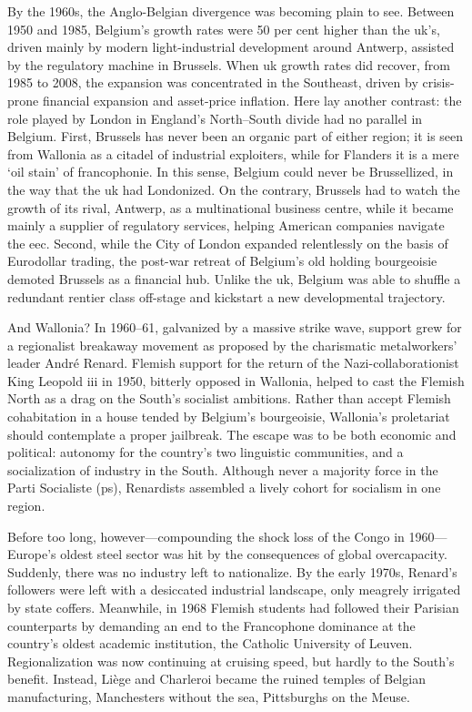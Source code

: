 \documentclass[
]{book}
\begin{document}
By the 1960s, the Anglo-Belgian divergence was becoming plain to see. Between 1950 and 1985, Belgium's growth rates were 50 per cent higher than the uk's, driven mainly by modern light-industrial development around Antwerp, assisted by the regulatory machine in Brussels. When uk growth rates did recover, from 1985 to 2008, the expansion was concentrated in the Southeast, driven by crisis-prone financial expansion and asset-price inflation. Here lay another contrast: the role played by London in England's North--South divide had no parallel in Belgium. First, Brussels has never been an organic part of either region; it is seen from Wallonia as a citadel of industrial exploiters, while for Flanders it is a mere `oil stain' of francophonie. In this sense, Belgium could never be Brussellized, in the way that the uk had Londonized. On the contrary, Brussels had to watch the growth of its rival, Antwerp, as a multinational business centre, while it became mainly a supplier of regulatory services, helping American companies navigate the eec. Second, while the City of London expanded relentlessly on the basis of Eurodollar trading, the post-war retreat of Belgium's old holding bourgeoisie demoted Brussels as a financial hub. Unlike the uk, Belgium was able to shuffle a redundant rentier class off-stage and kickstart a new developmental trajectory.

And Wallonia? In 1960--61, galvanized by a massive strike wave, support grew for a regionalist breakaway movement as proposed by the charismatic metalworkers' leader André Renard. Flemish support for the return of the Nazi-collaborationist King Leopold iii in 1950, bitterly opposed in Wallonia, helped to cast the Flemish North as a drag on the South's socialist ambitions. Rather than accept Flemish cohabitation in a house tended by Belgium's bourgeoisie, Wallonia's proletariat should contemplate a proper jailbreak. The escape was to be both economic and political: autonomy for the country's two linguistic communities, and a socialization of industry in the South. Although never a majority force in the Parti Socialiste (ps), Renardists assembled a lively cohort for socialism in one region.

Before too long, however---compounding the shock loss of the Congo in 1960---Europe's oldest steel sector was hit by the consequences of global overcapacity. Suddenly, there was no industry left to nationalize. By the early 1970s, Renard's followers were left with a desiccated industrial landscape, only meagrely irrigated by state coffers. Meanwhile, in 1968 Flemish students had followed their Parisian counterparts by demanding an end to the Francophone dominance at the country's oldest academic institution, the Catholic University of Leuven. Regionalization was now continuing at cruising speed, but hardly to the South's benefit. Instead, Liège and Charleroi became the ruined temples of Belgian manufacturing, Manchesters without the sea, Pittsburghs on the Meuse.
\end{document}
